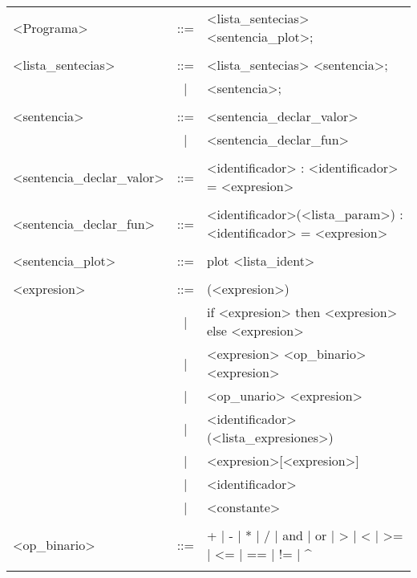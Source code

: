 \begin{tabular}{| p{3.5cm} c p{10cm} |}
\hline

<Programa>                &::=& <lista\_sentecias> <sentencia\_plot>; \\
&&\\

<lista\_sentecias>         &::=&  <lista\_sentecias> <sentencia>; \\
                           &|&  <sentencia>; \\
&&\\

<sentencia>               &::=&  <sentencia\_declar\_valor> \\
                           &|&  <sentencia\_declar\_fun> \\
&&\\

<sentencia\_declar\_valor>  &::=&  <identificador> : <identificador> = <expresion> \\
&&\\

<sentencia\_declar\_fun>    &::=&  <identificador>(<lista\_param>) : <identificador> = <expresion> \\
&&\\

<sentencia\_plot>          &::=&  plot <lista\_ident> \\
&&\\

<expresion>               &::=&  (<expresion>) \\
                           &|&  if <expresion> then <expresion> else <expresion> \\
                           &|&  <expresion> <op\_binario> <expresion> \\
                           &|&  <op\_unario> <expresion> \\
                           &|&  <identificador>(<lista\_expresiones>) \\
                           &|&  <expresion>[<expresion>] \\
                           &|&  <identificador> \\
                           &|&  <constante> \\
&&\\
                         
<op\_binario>              &::=& + |  - |  * |  / |  and |  or |  > |  < |  >= |  <= |  == |  != |  \^{} \\
&&\\


\end{tabular}
